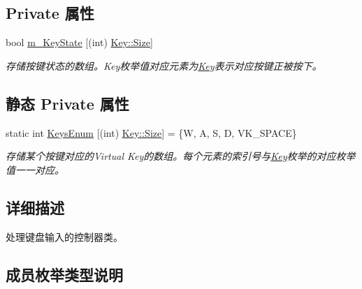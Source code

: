 \subsection*{Private 属性}
\begin{DoxyCompactItemize}
\item 
bool \hyperlink{class_input_controller_aebe382d8d20e579a3f2c92b58ad53ac3}{m\+\_\+\+Key\+State} \mbox{[}(int) \hyperlink{class_input_controller_a840a7425e2220e1ef5659a7ea4ba122da6f6cb72d544962fa333e2e34ce64f719}{Key\+::\+Size}\mbox{]}
\begin{DoxyCompactList}\small\item\em 存储按键状态的数组。\+Key枚举值对应元素为\hyperlink{class_input_controller_a840a7425e2220e1ef5659a7ea4ba122d}{Key}表示对应按键正被按下。 \end{DoxyCompactList}\end{DoxyCompactItemize}
\subsection*{静态 Private 属性}
\begin{DoxyCompactItemize}
\item 
static int \hyperlink{class_input_controller_afa9908a71b2107375b9104e51b465b06}{Keys\+Enum} \mbox{[}(int) \hyperlink{class_input_controller_a840a7425e2220e1ef5659a7ea4ba122da6f6cb72d544962fa333e2e34ce64f719}{Key\+::\+Size}\mbox{]} = \{\textquotesingle{}W\textquotesingle{}, \textquotesingle{}A\textquotesingle{}, \textquotesingle{}S\textquotesingle{}, \textquotesingle{}D\textquotesingle{}, V\+K\+\_\+\+S\+P\+A\+CE\}
\begin{DoxyCompactList}\small\item\em 存储某个按键对应的\+Virtual Key的数组。每个元素的索引号与\hyperlink{class_input_controller_a840a7425e2220e1ef5659a7ea4ba122d}{Key}枚举的对应枚举值一一对应。 \end{DoxyCompactList}\end{DoxyCompactItemize}


\subsection{详细描述}
处理键盘输入的控制器类。 



\subsection{成员枚举类型说明}
\mbox{\label{class_input_controller_a840a7425e2220e1ef5659a7ea4ba122d}} 
